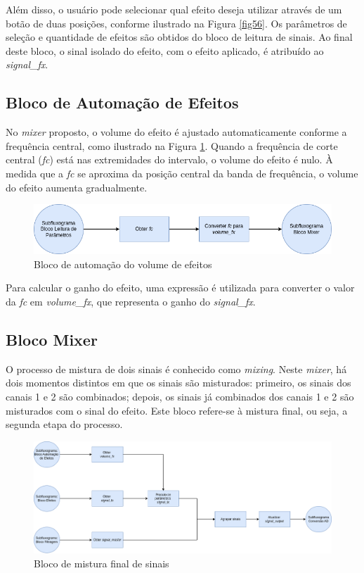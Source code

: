 Além disso, o usuário pode selecionar qual efeito deseja utilizar através de um botão de duas posições, conforme ilustrado na Figura \ref{fig56}. Os parâmetros de seleção e quantidade de efeitos são obtidos do bloco de leitura de sinais. Ao final deste bloco, o sinal isolado do efeito, com o efeito aplicado, é atribuído ao \textit{signal\_fx}.

\subsection{Bloco de Automação de Efeitos}

No \textit{mixer} proposto, o volume do efeito é ajustado automaticamente conforme a frequência central, como ilustrado na Figura \ref{fig57}. Quando a frequência de corte central (\textit{fc}) está nas extremidades do intervalo, o volume do efeito é nulo. À medida que a \textit{fc} se aproxima da posição central da banda de frequência, o volume do efeito aumenta gradualmente.

\begin{figure}[h]
    \centering
    \includegraphics[width=\textwidth]{figuras/fig57.png}
    \caption{Bloco de automação do volume de efeitos}
    \label{fig57}
\end{figure}

Para calcular o ganho do efeito, uma expressão é utilizada para converter o valor da \textit{fc} em \textit{volume\_fx}, que representa o ganho do \textit{signal\_fx}.

\subsection{Bloco Mixer}

O processo de mistura de dois sinais é conhecido como \textit{mixing}. Neste \textit{mixer}, há dois momentos distintos em que os sinais são misturados: primeiro, os sinais dos canais 1 e 2 são combinados; depois, os sinais já combinados dos canais 1 e 2 são misturados com o sinal do efeito. Este bloco refere-se à mistura final, ou seja, a segunda etapa do processo.

\begin{figure}[h]
    \centering
    \includegraphics[width=\textwidth]{figuras/fig58.png}
    \caption{Bloco de mistura final de sinais}
    \label{fig58}
\end{figure}

